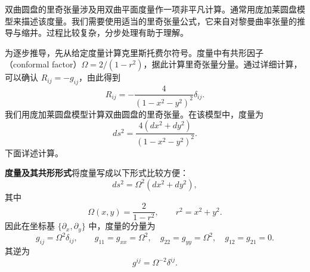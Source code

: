 \begin{enumerate}
\begin{enumerate}[label=\alph*.]
    双曲圆盘的里奇张量涉及用双曲平面度量作一项非平凡计算。通常用庞加莱圆盘模型来描述该度量。我们需要使用适当的里奇张量公式，它来自对黎曼曲率张量的推导与缩并。过程比较复杂，分步处理有助于理解。

    为逐步推导，先从给定度量计算克里斯托费尔符号。度量中有共形因子（conformal factor）$\Omega=2/(1-r^2)$，据此计算里奇张量分量。通过详细计算，可以确认 $R_{ij}=-g_{ij}$，由此得到
    \begin{equation*}
      R_{ij}=-\frac4{(1-x^2-y^2)^2}\delta_{ij}.
      \tag{5B42}\label{eq:5B42}
    \end{equation*}
    我们用庞加莱圆盘模型计算双曲圆盘的里奇张量。在该模型中，度量为
    \begin{equation*}
      ds^2=\frac{4(dx^2+dy^2)}{(1-x^2-y^2)^2}.
      \tag{5B43}\label{eq:5B43}
    \end{equation*}
    下面详述计算。

    \textbf{度量及其共形形式}\quad 将度量写成以下形式比较方便：
    \begin{equation*}
      ds^2=\Omega^2(dx^2+dy^2),
      \tag{5B44}\label{eq:5B44}
    \end{equation*}
    其中
    \[
      \Omega(x,y)=\frac2{1-r^2},\qquad r^2=x^2+y^2.
    \]
    因此在坐标基 $\{\partial_x,\partial_y\}$ 中，度量的分量为
    \[
      g_{ij}=\Omega^2\delta_{ij},\qquad g_{11}=g_{xx}=\Omega^2,\quad
      g_{22}=g_{yy}=\Omega^2,\quad g_{12}=g_{21}=0.
    \]
    其逆为
    \begin{equation*}
      g^{ij}=\Omega^{-2}\delta^{ij}.
      \tag{5B45}\label{eq:5B45}
    \end{equation*}
  \end{enumerate}
\end{enumerate}
